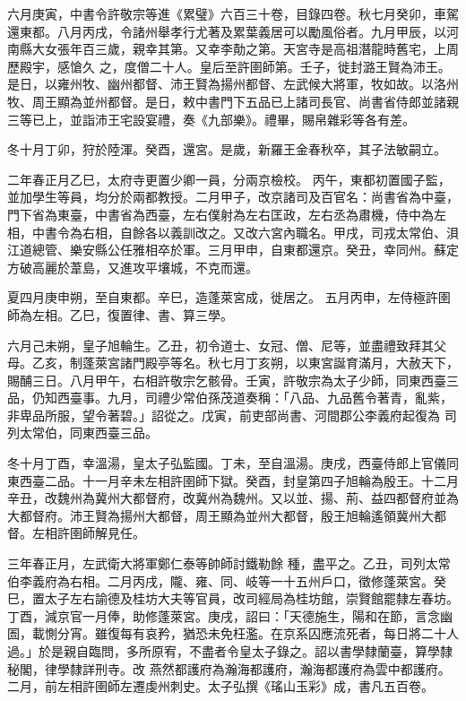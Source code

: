 \begin{pinyinscope}
 六月庚寅，中書令許敬宗等進《累璧》六百三十卷，目錄四卷。秋七月癸卯，車駕還東都。八月丙戌，令諸州舉孝行尤著及累葉義居可以勵風俗者。九月甲辰，以河南縣大女張年百三歲，親幸其第。又幸李勣之第。天宮寺是高祖潛龍時舊宅，上周歷殿宇，感愴久
 之，度僧二十人。皇后至許圉師第。壬子，徙封潞王賢為沛王。是日，以雍州牧、幽州都督、沛王賢為揚州都督、左武候大將軍，牧如故。以洛州牧、周王顯為並州都督。是日，敕中書門下五品已上諸司長官、尚書省侍郎並諸親三等已上，並詣沛王宅設宴禮，奏《九部樂》。禮畢，賜帛雜彩等各有差。



 冬十月丁卯，狩於陸渾。癸酉，還宮。是歲，新羅王金春秋卒，其子法敏嗣立。



 二年春正月乙巳，太府寺更置少卿一員，分兩京檢校。
 丙午，東都初置國子監，並加學生等員，均分於兩都教授。二月甲子，改京諸司及百官名：尚書省為中臺，門下省為東臺，中書省為西臺，左右僕射為左右匡政，左右丞為肅機，侍中為左相，中書令為右相，自餘各以義訓改之。又改六宮內職名。甲戌，司戎太常伯、浿江道總管、樂安縣公任雅相卒於軍。三月甲申，自東都還京。癸丑，幸同州。蘇定方破高麗於葦島，又進攻平壤城，不克而還。



 夏四月庚申朔，至自東都。辛巳，造蓬萊宮成，徙居之。
 五月丙申，左侍極許圉師為左相。乙巳，復置律、書、算三學。



 六月己未朔，皇子旭輪生。乙丑，初令道士、女冠、僧、尼等，並盡禮致拜其父母。乙亥，制蓬萊宮諸門殿亭等名。秋七月丁亥朔，以東宮誕育滿月，大赦天下，賜酺三日。八月甲午，右相許敬宗乞骸骨。壬寅，許敬宗為太子少師，同東西臺三品，仍知西臺事。九月，司禮少常伯孫茂道奏稱：「八品、九品舊令著青，亂紫，非卑品所服，望令著碧。」詔從之。戊寅，前吏部尚書、河間郡公李義府起復為
 司列太常伯，同東西臺三品。



 冬十月丁酉，幸溫湯，皇太子弘監國。丁未，至自溫湯。庚戌，西臺侍郎上官儀同東西臺二品。十一月辛未左相許圉師下獄。癸酉，封皇第四子旭輪為殷王。十二月辛丑，改魏州為冀州大都督府，改冀州為魏州。又以並、揚、荊、益四都督府並為大都督府。沛王賢為揚州大都督，周王顯為並州大都督，殷王旭輪遙領冀州大都督。左相許圉師解見任。



 三年春正月，左武衛大將軍鄭仁泰等帥師討鐵勒餘
 種，盡平之。乙丑，司列太常伯李義府為右相。二月丙戌，隴、雍、同、岐等一十五州戶口，徵修蓬萊宮。癸巳，置太子左右諭德及桂坊大夫等官員，改司經局為桂坊館，崇賢館罷隸左春坊。丁酉，減京官一月俸，助修蓬萊宮。庚戌，詔曰：「天德施生，陽和在節，言念幽圄，載惻分宵。雖復每有哀矜，猶恐未免枉濫。在京系囚應流死者，每日將二十人過。」於是親自臨問，多所原宥，不盡者令皇太子錄之。詔以書學隸蘭臺，算學隸秘閣，律學隸詳刑寺。改
 燕然都護府為瀚海都護府，瀚海都護府為雲中都護府。二月，前左相許圉師左遷虔州刺史。太子弘撰《瑤山玉彩》成，書凡五百卷。




\end{pinyinscope}
